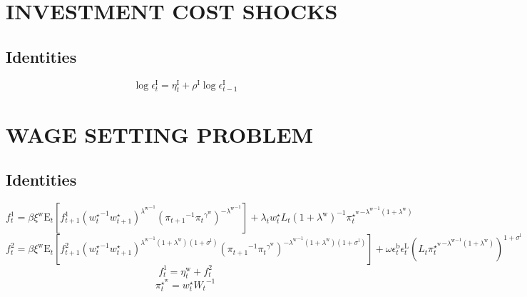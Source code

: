 \section{INVESTMENT COST SHOCKS}

\subsection{Identities}

\begin{equation}
\log{\epsilon^{\mathrm{I}}_{t}} = \eta^{\mathrm{I}}_{t} + {\rho^{\mathrm{I}}} {\log{\epsilon^{\mathrm{I}}_{t-1}}}
\end{equation}




\section{WAGE SETTING PROBLEM}

\subsection{Identities}

\begin{equation}
f^{\mathrm{1}}_{t} = {\beta} {\xi^{\mathrm{w}}} {\mathrm{E}_{t}\left[{f^{\mathrm{1}}_{t+1}} {\left({w^{\star}_{t}}^{-1} {w^{\star}_{t+1}}\right)^{{\lambda^{\mathrm{w}}}^{-1}}} {\left({\pi_{t+1}}^{-1} {{\pi_{t}}^{\gamma^{\mathrm{w}}}}\right)^{-{\lambda^{\mathrm{w}}}^{-1}}}\right]} + {\lambda_{t}} {w^{\star}_{t}} {L_{t}} \left(1 + \lambda^{\mathrm{w}}\right)^{-1} {{\pi^{\star^{\mathrm{w}}}_{t}}^{-{\lambda^{\mathrm{w}}}^{-1} \left(1 + \lambda^{\mathrm{w}}\right)}}
\end{equation}
\begin{equation}
f^{\mathrm{2}}_{t} = {\beta} {\xi^{\mathrm{w}}} {\mathrm{E}_{t}\left[{f^{\mathrm{2}}_{t+1}} {\left({w^{\star}_{t}}^{-1} {w^{\star}_{t+1}}\right)^{{\lambda^{\mathrm{w}}}^{-1} \left(1 + \lambda^{\mathrm{w}}\right) \left(1 + \sigma^{\mathrm{l}}\right)}} {\left({\pi_{t+1}}^{-1} {{\pi_{t}}^{\gamma^{\mathrm{w}}}}\right)^{-{\lambda^{\mathrm{w}}}^{-1} \left(1 + \lambda^{\mathrm{w}}\right) \left(1 + \sigma^{\mathrm{l}}\right)}}\right]} + {\omega} {\epsilon^{\mathrm{b}}_{t}} {\epsilon^{\mathrm{L}}_{t}} {\left({L_{t}} {{\pi^{\star^{\mathrm{w}}}_{t}}^{-{\lambda^{\mathrm{w}}}^{-1} \left(1 + \lambda^{\mathrm{w}}\right)}}\right)^{1 + \sigma^{\mathrm{l}}}}
\end{equation}
\begin{equation}
f^{\mathrm{1}}_{t} = \eta^{\mathrm{w}}_{t} + f^{\mathrm{2}}_{t}
\end{equation}
\begin{equation}
\pi^{\star^{\mathrm{w}}}_{t} = {w^{\star}_{t}} {W_{t}}^{-1}
\end{equation}




